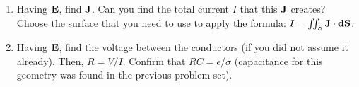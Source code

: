 \documentclass[../../header.tex]{subfiles}
\begin{document}
\begin{enumerate}
\item Having $\mathbf{E}$, find $\mathbf{J}$. Can you find the total current $I$ that this $\mathbf{J}$ creates? Choose the surface that you need to use to apply the formula: 
$I = \iint_S \mathbf{J} \cdot \mathbf{dS}$.\\

\item Having $\mathbf{E}$, find the voltage between the conductors (if you did not assume it 
already). Then, $R=V/I$. Confirm that $R C = \epsilon / \sigma $ (capacitance for this geometry was found in the previous problem set). \\
\end{enumerate}
\end{document}
